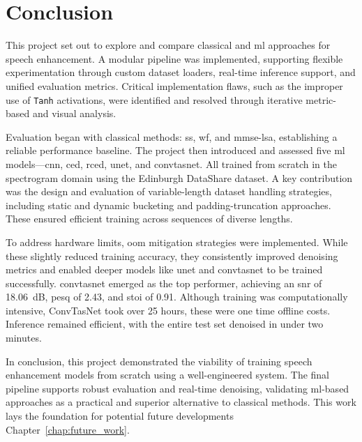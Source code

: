 \chapter{Conclusion}
\label{chap:conclusion}

This project set out to explore and compare classical and \gls{ml} approaches for speech enhancement. A modular pipeline was implemented, supporting flexible experimentation through custom dataset loaders, real-time inference support, and unified evaluation metrics. Critical implementation flaws, such as the improper use of \texttt{Tanh} activations, were identified and resolved through iterative metric-based and visual analysis.

Evaluation began with classical methods: \gls{ss}, \gls{wf}, and \gls{mmse-lsa}, establishing a reliable performance baseline. The project then introduced and assessed five \gls{ml} models—\gls{cnn}, \gls{ced}, \gls{rced}, \gls{unet}, and \gls{convtasnet}. All trained from scratch in the spectrogram domain using the Edinburgh DataShare dataset. A key contribution was the design and evaluation of variable-length dataset handling strategies, including static and dynamic bucketing and padding-truncation approaches. These ensured efficient training across sequences of diverse lengths.

To address hardware limits, \gls{oom} mitigation strategies were implemented. While these slightly reduced training accuracy, they consistently improved denoising metrics and enabled deeper models like \gls{unet} and \gls{convtasnet} to be trained successfully. \gls{convtasnet} emerged as the top performer, achieving an \gls{snr} of 18.06~dB, \gls{pesq} of 2.43, and \gls{stoi} of 0.91. Although training was computationally intensive, ConvTasNet took over 25 hours, these were one time offline costs. Inference remained efficient, with the entire test set denoised in under two minutes.

In conclusion, this project demonstrated the viability of training speech enhancement models from scratch using a well-engineered system. The final pipeline supports robust evaluation and real-time denoising, validating \gls{ml}-based approaches as a practical and superior alternative to classical methods. This work lays the foundation for potential future developments Chapter~\ref{chap:future_work}.
